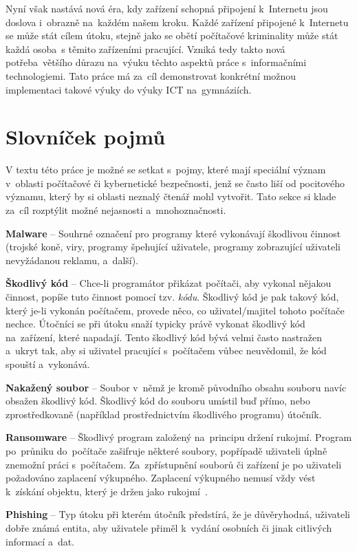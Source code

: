 \documentclass[a4paper, 12pt]{article}
\begin{document}
Nyní však nastává nová éra, kdy zařízení schopná připojení k~Internetu jsou doslova i~obrazně na~každém našem kroku. Každé zařízení připojené k~Internetu se může stát cílem útoku, stejně jako se obětí počítačové kriminality může stát každá osoba~s těmito zařízeními pracující. Vzniká tedy takto nová potřeba~většího důrazu na~výuku těchto aspektů práce s~informačními technologiemi. Tato práce má za~cíl demonstrovat konkrétní možnou implementaci takové výuky do výuky ICT na~gymnáziích.

\newpage
\section{Slovníček pojmů}
V textu této práce je možné se setkat s~pojmy, které mají speciální význam v~oblasti počítačové či kybernetické bezpečnosti, jenž se často liší od pocitového významu, který by si oblasti neznalý čtenář mohl vytvořit. Tato sekce si klade za~cíl rozptýlit možné nejasnosti a~mnohoznačnosti.

\textbf{Malware} -- Souhrné označení pro programy které vykonávají škodlivou činnost (trojské koně, viry, programy špehující uživatele, programy zobrazující uživateli nevyžádanou reklamu, a~další).

\textbf{Škodlivý kód} -- Chce-li programátor přikázat počítači, aby vykonal nějakou činnost, popíše tuto činnost pomocí tzv. \textit{kódu}. Škodlivý kód je pak takový kód, který je-li vykonán počítačem, provede něco, co uživatel/majitel tohoto počítače nechce. Útočníci se při útoku snaží typicky právě vykonat škodlivý kód na~zařízení, které napadají. Tento škodlivý kód bývá velmi často nastražen a~ukryt tak, aby si uživatel pracující s~počítačem vůbec neuvědomil, že kód spouští a~vykonává.

\textbf{Nakažený soubor} -- Soubor v~němž je kromě původního obsahu souboru navíc obsažen škodlivý kód. Škodlivý kód do souboru umístil buď přímo, nebo zprostředkovaně (například prostřednictvím škodlivého programu) útočník.

\textbf{Ransomware} -- Škodlivý program založený na~principu držení rukojmí. Program po~průniku do~počítače zašifruje některé soubory, popřípadě uživateli úplně znemožní práci s~počítačem. Za~zpřístupnění souborů či zařízení je po uživateli požadováno zaplacení výkupného. Zaplacení výkupného nemusí vždy vést k~získání objektu, který je držen jako rukojmí~\cite{ransomware}.

\textbf{Phishing} -- Typ útoku při kterém útočník předstírá, že je důvěryhodná, uživateli dobře známá entita, aby uživatele přiměl k~vydání osobních či jinak citlivých informací a~dat.
\end{document}
